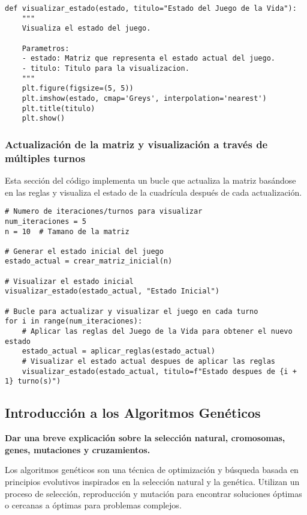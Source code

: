 \begin{lstlisting}
def visualizar_estado(estado, titulo="Estado del Juego de la Vida"):
    """
    Visualiza el estado del juego.
    
    Parametros:
    - estado: Matriz que representa el estado actual del juego.
    - titulo: Titulo para la visualizacion.
    """
    plt.figure(figsize=(5, 5))
    plt.imshow(estado, cmap='Greys', interpolation='nearest')
    plt.title(titulo)
    plt.show()
\end{lstlisting}

\subsubsection*{Actualización de la matriz y visualización a través de múltiples turnos}

Esta sección del código implementa un bucle que actualiza la matriz basándose en las reglas y 
visualiza el estado de la cuadrícula después de cada actualización.

\begin{lstlisting}
# Numero de iteraciones/turnos para visualizar
num_iteraciones = 5
n = 10  # Tamano de la matriz

# Generar el estado inicial del juego
estado_actual = crear_matriz_inicial(n)

# Visualizar el estado inicial
visualizar_estado(estado_actual, "Estado Inicial")

# Bucle para actualizar y visualizar el juego en cada turno
for i in range(num_iteraciones):
    # Aplicar las reglas del Juego de la Vida para obtener el nuevo estado
    estado_actual = aplicar_reglas(estado_actual)
    # Visualizar el estado actual despues de aplicar las reglas
    visualizar_estado(estado_actual, titulo=f"Estado despues de {i + 1} turno(s)")
\end{lstlisting}


\subsection{Introducción a los Algoritmos Genéticos}

\textbf{Dar una breve explicación sobre la selección natural, cromosomas, genes, mutaciones y cruzamientos.}

Los algoritmos genéticos son una técnica de optimización y búsqueda basada en principios evolutivos inspirados en la selección natural y la genética. Utilizan un proceso de selección, reproducción y mutación para encontrar soluciones óptimas o cercanas a óptimas para problemas complejos.

